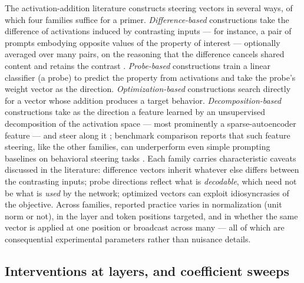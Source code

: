 The activation-addition literature constructs steering vectors in several ways, of which four families suffice for a primer. \emph{Difference-based} constructions take the difference of activations induced by contrasting inputs --- for instance, a pair of prompts embodying opposite values of the property of interest --- optionally averaged over many pairs, on the reasoning that the difference cancels shared content and retains the contrast \cite{zourepe}. \emph{Probe-based} constructions train a linear classifier (a probe) to predict the property from activations and take the probe's weight vector as the direction. \emph{Optimization-based} constructions search directly for a vector whose addition produces a target behavior. \emph{Decomposition-based} constructions take as the direction a feature learned by an unsupervised decomposition of the activation space --- most prominently a sparse-autoencoder feature --- and steer along it \cite{templeton}; benchmark comparison reports that such feature steering, like the other families, can underperform even simple prompting baselines on behavioral steering tasks \cite{axbench}. Each family carries characteristic caveats discussed in the literature: difference vectors inherit whatever else differs between the contrasting inputs; probe directions reflect what is \emph{decodable}, which need not be what is \emph{used} by the network; optimized vectors can exploit idiosyncrasies of the objective. Across families, reported practice varies in normalization (unit norm or not), in the layer and token positions targeted, and in whether the same vector is applied at one position or broadcast across many --- all of which are consequential experimental parameters rather than nuisance details.

\subsection{Interventions at layers, and coefficient sweeps}\label{ch02:steering:sweeps}

